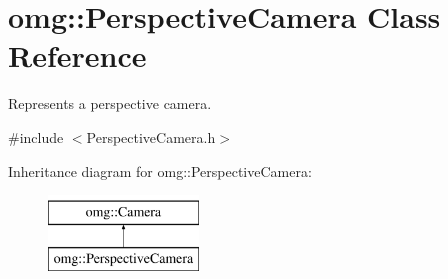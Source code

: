 \hypertarget{classomg_1_1_perspective_camera}{}\section{omg\+::Perspective\+Camera Class Reference}
\label{classomg_1_1_perspective_camera}


Represents a perspective camera.  




{\ttfamily \#include $<$Perspective\+Camera.\+h$>$}

Inheritance diagram for omg\+::Perspective\+Camera\+:\begin{figure}[H]
\begin{center}
\leavevmode
\includegraphics[height=2.000000cm]{classomg_1_1_perspective_camera}
\end{center}
\end{figure}

